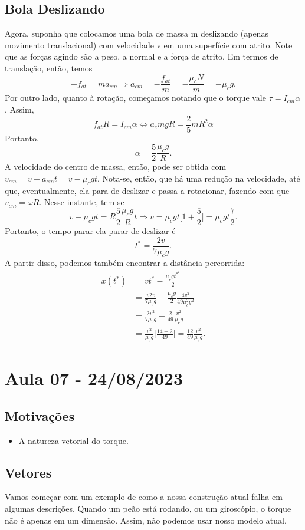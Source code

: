 \documentclass{article}
\begin{document}
\subsection{Bola Deslizando}
Agora, suponha que colocamos uma bola de massa m deslizando (apenas movimento translacional) com velocidade v em uma superfície com atrito. Note que as forças agindo são
a peso, a normal e a força de atrito. Em termos de translação, então, temos 
\[
  -f_{at} = ma_{cm} \Rightarrow a_{cm} = -\frac{f_{at}}{m} = -\frac{\mu_{c}N}{m} = -\mu_{c}g.
\]
Por outro lado, quanto à rotação, começamos notando que o torque vale \(\tau = I_{cm}\alpha \). Assim, 
\[
  f_{at}R = I_{cm}\alpha \Longleftrightarrow a_{c}mgR = \frac{2}{5}mR^{2}\alpha
\]
Portanto, 
\[
  \alpha = \frac{5}{2}\frac{\mu_{c}g}{R}.
\]
A velocidade do centro de massa, então, pode ser obtida com \(v_{cm} = v - a_{cm}t = v - \mu_{c}gt\). Nota-se, então,
que há uma redução na velocidade, até que, eventualmente, ela para de deslizar e passa a rotacionar, fazendo com que \(v_{cm} = \omega R\). 
Nesse instante, tem-se 
\[
  v-\mu_{c}gt = R\frac{5}{2}\frac{\mu_{c}g}{R}t \Rightarrow v = \mu_{c}gt\biggl[1+\frac{5}{2}\biggr] = \mu_{c}gt \frac{7}{2}.
\]
Portanto, o tempo parar ela parar de deslizar é 
\[
  \boxed{t^{*} = \frac{2v}{7\mu_{c}g}.}
\]
A partir disso, podemos também encontrar a distância percorrida:
\begin{align*}
  x(t^{*}) &= vt^{*} - \frac{\mu_{c}gt^{*^{2}}}{2}\\
           &= \frac{v2v}{7\mu_{c}g} - \frac{\mu_{c}g}{2}\frac{4v^{2}}{49\mu_{c}^{2}g^{2}}\\
           &= \frac{2v^{2}}{7\mu_{c}g} - \frac{2}{49}\frac{v^{2}}{\mu_{c}g}\\
           &= \frac{v^{2}}{\mu_{c}g}\biggl[\frac{14-2}{49}\biggr] = \boxed{\frac{12}{49}\frac{v^{2}}{\mu_{c}g}.}
\end{align*}
\newpage

\section{Aula 07 - 24/08/2023}
\subsection{Motivações} 
\begin{itemize}
  \item A natureza vetorial do torque. 
\end{itemize}
\subsection{Vetores}
Vamos começar com um exemplo de como a nossa construção atual falha em algumas descrições.
Quando um peão está rodando, ou um giroscópio, o torque não é apenas em um dimensão. Assim, não podemos usar nosso modelo atual.
\end{document}
